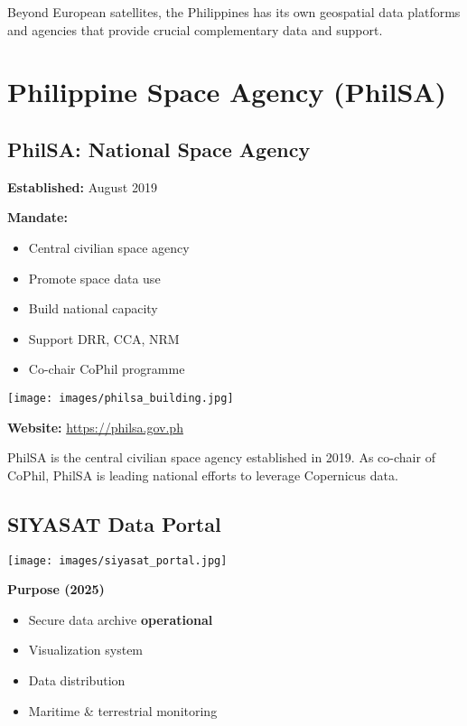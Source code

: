 \documentclass[
  letterpaper,
  DIV=11,
  numbers=noendperiod]{scrartcl}
\providecommand{\tightlist}{%
  \setlength{\itemsep}{0pt}\setlength{\parskip}{0pt}}
\begin{document}
Beyond European satellites, the Philippines has its own geospatial data
platforms and agencies that provide crucial complementary data and
support.

\section{Philippine Space Agency
(PhilSA)}\label{philippine-space-agency-philsa}

\subsection{PhilSA: National Space
Agency}\label{philsa-national-space-agency}

\textbf{Established:} August 2019

\textbf{Mandate:}

\begin{itemize}
\tightlist
\item
  Central civilian space agency
\item
  Promote space data use
\item
  Build national capacity
\item
  Support DRR, CCA, NRM
\item
  Co-chair CoPhil programme
\end{itemize}

\texttt{[image: images/philsa\_building.jpg]}

\textbf{Website:} \url{https://philsa.gov.ph}

PhilSA is the central civilian space agency established in 2019. As
co-chair of CoPhil, PhilSA is leading national efforts to leverage
Copernicus data.

\subsection{SIYASAT Data Portal}\label{siyasat-data-portal}

\begin{center}
\texttt{[image: images/siyasat\_portal.jpg]}
\end{center}

\textbf{Purpose (2025)}

\begin{itemize}
\tightlist
\item
  Secure data archive \textbf{operational}
\item
  Visualization system
\item
  Data distribution
\item
  Maritime \& terrestrial monitoring
\end{itemize}
\end{document}
